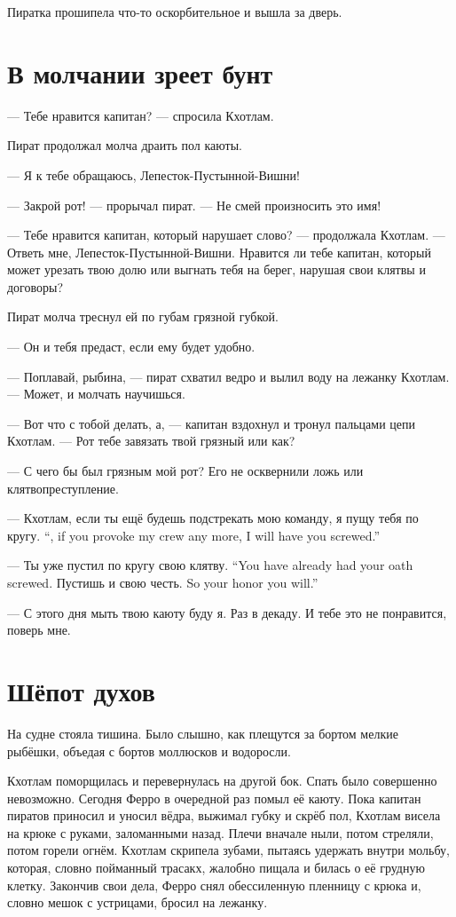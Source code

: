 Пиратка прошипела что-то оскорбительное и вышла за дверь.

\section{В молчании зреет бунт}

--- Тебе нравится капитан? --- спросила Кхотлам.

Пират продолжал молча драить пол каюты.

--- Я к тебе обращаюсь, Лепесток-Пустынной-Вишни!

--- Закрой рот! --- прорычал пират.
--- Не смей произносить это имя!

--- Тебе нравится капитан, который нарушает слово? --- продолжала Кхотлам.
--- Ответь мне, Лепесток-Пустынной-Вишни.
Нравится ли тебе капитан, который может урезать твою долю или выгнать тебя на берег, нарушая свои клятвы и договоры?

Пират молча треснул ей по губам грязной губкой.

--- Он и тебя предаст, если ему будет удобно.

--- Поплавай, рыбина, --- пират схватил ведро и вылил воду на лежанку Кхотлам.
--- Может, и молчать научишься.

\asterism

--- Вот что с тобой делать, а, --- капитан вздохнул и тронул пальцами цепи Кхотлам.
--- Рот тебе завязать твой грязный или как?

--- С чего бы был грязным мой рот?
Его не осквернили ложь или клятвопреступление.

{--- Кхотлам, если ты ещё будешь подстрекать мою команду, я пущу тебя по кругу.}
{``\Kchotlam, if you provoke my crew any more, I will have you screwed.''}

{--- Ты уже пустил по кругу свою клятву.}
{``You have already had your oath screwed.}
{Пустишь и свою честь.}
{So your honor you will.''}

--- С этого дня мыть твою каюту буду я.
Раз в декаду.
И тебе это не понравится, поверь мне.

\section{Шёпот духов}

На судне стояла тишина.
Было слышно, как плещутся за бортом мелкие рыбёшки, объедая с бортов моллюсков и водоросли.

Кхотлам поморщилась и перевернулась на другой бок.
Спать было совершенно невозможно.
Сегодня Ферро в очередной раз помыл её каюту.
Пока капитан пиратов приносил и уносил вёдра, выжимал губку и скрёб пол, Кхотлам висела на крюке с руками, заломанными назад.
Плечи вначале ныли, потом стреляли, потом горели огнём.
Кхотлам скрипела зубами, пытаясь удержать внутри мольбу, которая, словно пойманный трасакх, жалобно пищала и билась о её грудную клетку.
Закончив свои дела, Ферро снял обессиленную пленницу с крюка и, словно мешок с устрицами, бросил на лежанку.

